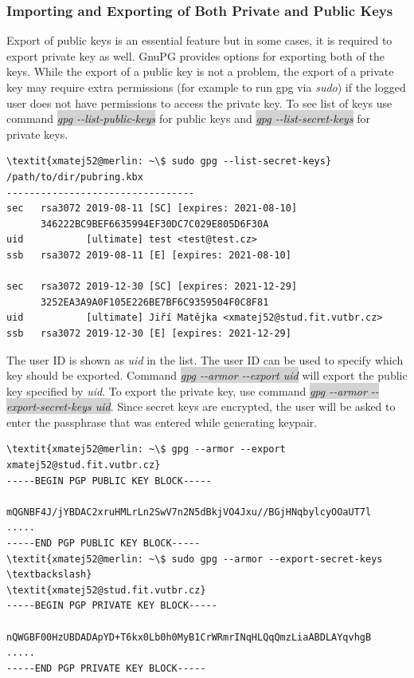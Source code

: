 \subsubsection*{Importing and Exporting of Both Private and Public Keys}
\label{text:keys-export}
Export of public keys is an essential feature but in some cases, it is required to export private key as well. GnuPG provides options for exporting both of the keys. While the export of a public key is not a problem, the export of a private key may require extra permissions (for example to run gpg via \textit{sudo}) if the logged user does not have permissions to access the private key. To see list of keys use command \colorbox{lightgray}{\textit{gpg -{}-list-public-keys}} for public keys and \colorbox{lightgray}{\textit{gpg -{}-list-secret-keys}} for private keys. 
\begin{Verbatim}[commandchars=\\\{\},codes={\catcode`$=3\catcode`_=8},samepage=true,frame=single]
\textit{xmatej52@merlin: ~\$ sudo gpg --list-secret-keys}
/path/to/dir/pubring.kbx
---------------------------------
sec   rsa3072 2019-08-11 [SC] [expires: 2021-08-10]
      346222BC9BEF6635994EF30DC7C029E805D6F30A
uid           [ultimate] test <test@test.cz>
ssb   rsa3072 2019-08-11 [E] [expires: 2021-08-10]

sec   rsa3072 2019-12-30 [SC] [expires: 2021-12-29]
      3252EA3A9A0F105E226BE7BF6C9359504F0C8F81
uid           [ultimate] Jiří Matějka <xmatej52@stud.fit.vutbr.cz>
ssb   rsa3072 2019-12-30 [E] [expires: 2021-12-29]
\end{Verbatim}

The user ID is shown as \textit{uid} in the list. The user ID can be used to specify which key should be exported. Command \colorbox{lightgray}{\textit{gpg -{}-armor -{}-export uid}} will export the public key specified by \textit{uid}. To export the private key, use command \colorbox{lightgray}{\textit{gpg -{}-armor -{}-export-secret-keys uid}}. Since secret keys are encrypted, the user will be asked to enter the passphrase that was entered while generating keypair.
\begin{Verbatim}[commandchars=\\\{\},codes={\catcode`$=3\catcode`_=8},samepage=true,frame=single]
\textit{xmatej52@merlin: ~\$ gpg --armor --export xmatej52@stud.fit.vutbr.cz}
-----BEGIN PGP PUBLIC KEY BLOCK-----

mQGNBF4J/jYBDAC2xruHMLrLn2SwV7n2N5dBkjVO4Jxu//BGjHNqbylcyOOaUT7l
.....
-----END PGP PUBLIC KEY BLOCK-----
\textit{xmatej52@merlin: ~\$ sudo gpg --armor --export-secret-keys \textbackslash}
\textit{xmatej52@stud.fit.vutbr.cz}
-----BEGIN PGP PRIVATE KEY BLOCK-----

nQWGBF00HzUBDADApYD+T6kx0Lb0h0MyB1CrWRmrINqHLQqQmzLiaABDLAYqvhgB
.....
-----END PGP PRIVATE KEY BLOCK-----
\end{Verbatim}


